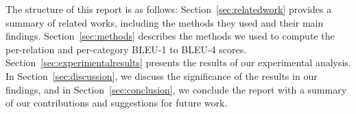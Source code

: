 
The structure of this report is as follows: Section~\ref{sec:relatedwork} provides a summary of related works, including the methods they used and their main findings. Section~\ref{sec:methods} describes the methods we used to compute the per-relation and per-category BLEU-1 to BLEU-4 scores. Section~\ref{sec:experimentalresults} presents the results of our experimental analysis. In Section~\ref{sec:discussion}, we discuss the significance of the results in our findings, and in Section~\ref{sec:conclusion}, we conclude the report with a summary of our contributions and suggestions for future work.